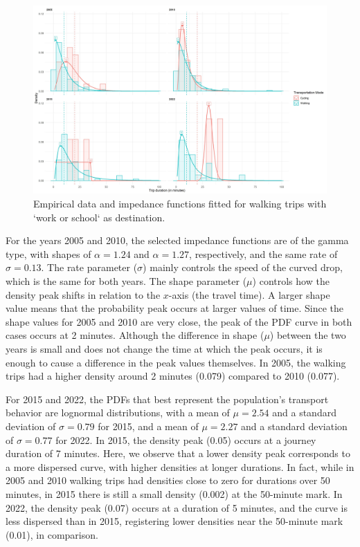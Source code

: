 \documentclass[preprint, 3p,
authoryear]{elsarticle} %
\begin{document}
\begin{figure}

{\centering \includegraphics[width=1\linewidth]{figures/impf_Outdoors} 

}

\caption{Empirical data and impedance functions fitted for walking trips with `work or school` as destination.}\label{fig:outdoors-impedance-fig}
\end{figure}

For the years 2005 and 2010, the selected impedance functions are of the
gamma type, with shapes of \(\alpha = 1.24\) and \(\alpha = 1.27\),
respectively, and the same rate of \(\sigma = 0.13\). The rate parameter
(\(\sigma\)) mainly controls the speed of the curved drop, which is the
same for both years. The shape parameter (\(\mu\)) controls how the
density peak shifts in relation to the \(x\)-axis (the travel time). A
larger shape value means that the probability peak occurs at larger
values of time. Since the shape values for 2005 and 2010 are very close,
the peak of the PDF curve in both cases occurs at 2 minutes. Although
the difference in shape (\(\mu\)) between the two years is small and
does not change the time at which the peak occurs, it is enough to cause
a difference in the peak values themselves. In 2005, the walking trips
had a higher density around 2 minutes (0.079) compared to 2010 (0.077).

For 2015 and 2022, the PDFs that best represent the population's
transport behavior are lognormal distributions, with a mean of
\(\mu = 2.54\) and a standard deviation of \(\sigma = 0.79\) for 2015,
and a mean of \(\mu = 2.27\) and a standard deviation of
\(\sigma = 0.77\) for 2022. In 2015, the density peak (0.05) occurs at a
journey duration of 7 minutes. Here, we observe that a lower density
peak corresponds to a more dispersed curve, with higher densities at
longer durations. In fact, while in 2005 and 2010 walking trips had
densities close to zero for durations over 50 minutes, in 2015 there is
still a small density (0.002) at the 50-minute mark. In 2022, the
density peak (0.07) occurs at a duration of 5 minutes, and the curve is
less dispersed than in 2015, registering lower densities near the
50-minute mark (0.01), in comparison.
\end{document}

